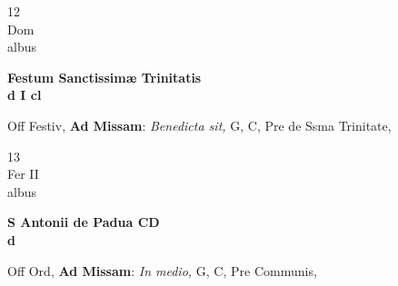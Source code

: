 \documentclass[10pt, openany]{book}
\begin{document}
        \begin{center}
            \begin{minipage}{3.5in}
                \vspace{2em}
                \begin{minipage}{0.5in}
                    {\Huge 12} \\
                    {\normalsize Dom} \\
                    {\normalsize albus}
                \end{minipage}
                \begin{minipage}{3.0in}
                    \textbf{ \large Festum Sanctissimæ Trinitatis \\
                    \textnormal{\normalsize d I cl}} \\ 
                \end{minipage}
                \begin{justify}Off Festiv, \textbf{Ad Missam}: \textit{Benedicta sit,} G, C, Pre de Ssma Trinitate,  
                \end{justify}
            \end{minipage}
        \end{center}
    
        \begin{center}
            \begin{minipage}{3.5in}
                \vspace{2em}
                \begin{minipage}{0.5in}
                    {\Huge 13} \\
                    {\normalsize Fer II} \\
                    {\normalsize albus}
                \end{minipage}
                \begin{minipage}{3.0in}
                    \textbf{ \large S Antonii de Padua CD \\
                    \textnormal{\normalsize d}} \\ 
                \end{minipage}
                \begin{justify}Off Ord, \textbf{Ad Missam}: \textit{In medio,} G, C, Pre Communis,  
                \end{justify}
            \end{minipage}
        \end{center}
    
\end{document}
